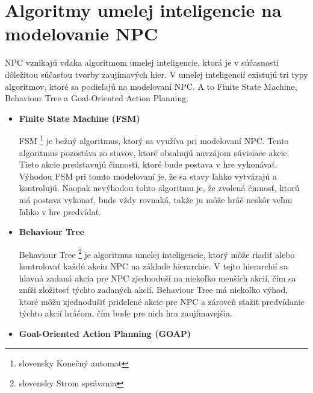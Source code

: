 \documentclass[10pt,twoside,slovak,a4paper]{article}
\begin{document}
\section{Algoritmy umelej inteligencie na modelovanie NPC} 
\quad NPC vznikajú vďaka algoritmom umelej inteligencie, ktorá je v súčasnosti dôležitou súčasťou tvorby zaujímavých hier. V umelej inteligencií existujú tri typy algoritmov, ktoré sa podieľajú na modelovaní NPC. A to Finite State Machine, Behaviour Tree a Goal-Oriented Action Planning.  
\begin{itemize}
\item \textbf{Finite State Machine (FSM)}

\quad FSM \footnote{slovensky Konečný automat} je bežný algoritmus, ktorý sa využíva pri modelovaní NPC. Tento algoritmus pozostáva zo stavov, ktoré obsahujú navzájom súvisiace akcie. Tieto akcie predstavujú činnosti, ktoré bude postava v hre vykonávať. Výhodou FSM pri tomto modelovaní je, že sa stavy ľahko vytvárajú a kontrolujú. Naopak nevýhodou tohto algoritmu je, že zvolená činnosť, ktorú má postava vykonať, bude vždy rovnaká, takže ju môže hráč neskôr veľmi ľahko v hre predvídať. \cite{NPC}


\item \textbf{Behaviour Tree}

\quad Behaviour Tree \footnote{slovensky Strom správania} je algoritmus umelej inteligencie, ktorý môže riadiť alebo kontrolovať každú akciu NPC na základe hierarchie. V tejto hierarchií sa hlavná zadaná akcia pre NPC zjednoduší na niekoľko menších akcií, čím sa zníži zložitosť týchto zadaných akcií. Behaviour Tree má niekoľko výhod, ktoré môžu zjednodušiť pridelené akcie pre NPC a zároveň sťažiť predvídanie týchto akcií hráčom, čím bude pre nich hra zaujímavejšia.   \cite{NPC}

\item \textbf{Goal-Oriented Action Planning (GOAP)}


\end{itemize}
\end{document}

